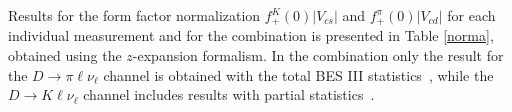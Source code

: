 
Results for the form factor normalization $f_+^K(0)|V_{cs}|$ and $f_+^{\pi}(0)|V_{cd}|$ for each individual measurement and for the combination is presented in Table \ref{norma}, obtained using the 
$z$-expansion formalism.
In the combination only the result for the $D \to \pi \ell \nu_\ell $ channel is obtained 
with the total BES III statistics~\cite{BESIII-new}, while the $D \to K \ell \nu_\ell $ 
channel includes results with partial statistics~\cite{BESIII}.\;

